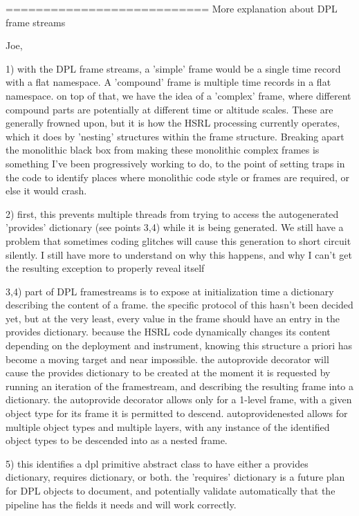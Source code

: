 ===========================
More explanation about DPL frame streams

Joe,

1) with the DPL frame streams, a 'simple' frame would be a single time record with a flat namespace. A 'compound' frame is multiple time records in a flat namespace. on top of that, we have the idea of a 'complex' frame, where different compound parts are potentially at different time or altitude scales. These are generally frowned upon, but it is how the HSRL processing currently operates, which it does by 'nesting' structures within the frame structure. Breaking apart the monolithic black box from making these monolithic complex frames is something I've been progressively working to do, to the point of setting traps in the code to identify places where monolithic code style or frames are required, or else it would crash.

2) first, this prevents multiple threads from trying to access the autogenerated 'provides' dictionary (see points 3,4) while it is being generated. We still have a problem that sometimes coding glitches will cause this generation to short circuit silently. I still have more to understand on why this happens, and why I can't get the resulting exception to properly reveal itself

3,4) part of DPL framestreams is to expose at initialization time a dictionary describing the content of a frame. the specific protocol of this hasn't been decided yet, but at the very least, every value in the frame should have an entry in the provides dictionary. because the HSRL code dynamically changes its content depending on the deployment and instrument, knowing this structure a priori has become a moving target and near impossible. the autoprovide decorator will cause the provides dictionary to be created at the moment it is requested by running an iteration of the framestream, and describing the resulting frame into a dictionary. the autoprovide decorator allows only for a 1-level frame, with a given object type for its frame it is permitted to descend. autoprovidenested allows for multiple object types and multiple layers, with any instance of the identified object types to be descended into as a nested frame.

5) this identifies a dpl primitive abstract class to have either a provides dictionary, requires dictionary, or both. the 'requires' dictionary is a future plan for DPL objects to document, and potentially validate automatically that the pipeline has the fields it needs and will work correctly.


